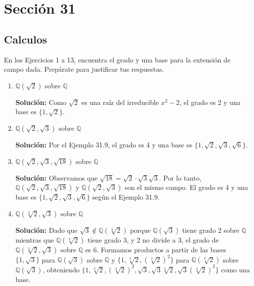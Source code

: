 \section*{Sección 31}

\subsection*{Calculos}
En los Ejercicios 1 a 13, encuentra el grado y una base para la extensión de campo dada. Prepárate para justificar tus respuestas.

\begin{enumerate}
    \item $\mathbb{Q}(\sqrt{2})$ sobre $\mathbb{Q}$
    
    \textbf{Solución:} Como \( \sqrt{2} \) es una raíz del irreducible \( x^2 - 2 \), el grado es 2 y una base es \(\{1, \sqrt{2}\}\).

    \item \( \mathbb{Q}(\sqrt{2}, \sqrt{3}) \) sobre \( \mathbb{Q} \)

    \textbf{Solución:} Por el Ejemplo 31.9, el grado es 4 y una base es \(\{1, \sqrt{2}, \sqrt{3}, \sqrt{6}\}\).

    \item \( \mathbb{Q}(\sqrt{2}, \sqrt{3}, \sqrt{18}) \) sobre \( \mathbb{Q} \)

    \textbf{Solución:} Observamos que \( \sqrt{18} = \sqrt{2} \cdot \sqrt{3} \sqrt{3} \). Por lo tanto, \( \mathbb{Q}(\sqrt{2}, \sqrt{3}, \sqrt{18}) \) y \( \mathbb{Q}(\sqrt{2}, \sqrt{3}) \) son el mismo campo. El grado es 4 y una base es \(\{1, \sqrt{2}, \sqrt{3}, \sqrt{6}\}\) según el Ejemplo 31.9.

    \item \( \mathbb{Q}(\sqrt[3]{2}, \sqrt{3}) \) sobre \( \mathbb{Q} \)

    \textbf{Solución:} Dado que \( \sqrt{3} \notin \mathbb{Q}(\sqrt[3]{2}) \) porque \( \mathbb{Q}(\sqrt{3}) \) tiene grado 2 sobre \( \mathbb{Q} \) mientras que \( \mathbb{Q}(\sqrt[3]{2}) \) tiene grado 3, y 2 no divide a 3, el grado de \( \mathbb{Q}(\sqrt[3]{2}, \sqrt{3}) \) sobre \( \mathbb{Q} \) es 6. Formamos productos a partir de las bases \(\{1, \sqrt{3}\}\) para \( \mathbb{Q}(\sqrt{3}) \) sobre \( \mathbb{Q} \) y \(\{1, \sqrt[3]{2}, (\sqrt[3]{2})^2\}\) para \( \mathbb{Q}(\sqrt[3]{2}) \) sobre \( \mathbb{Q}(\sqrt{3})\), obteniendo \(\{1, \sqrt[3]{2}, (\sqrt[3]{2})^2, \sqrt{3}, \sqrt{3}\sqrt[3]{2}, \sqrt{3}(\sqrt[3]{2})^2\}\) como una base.


\end{enumerate}
